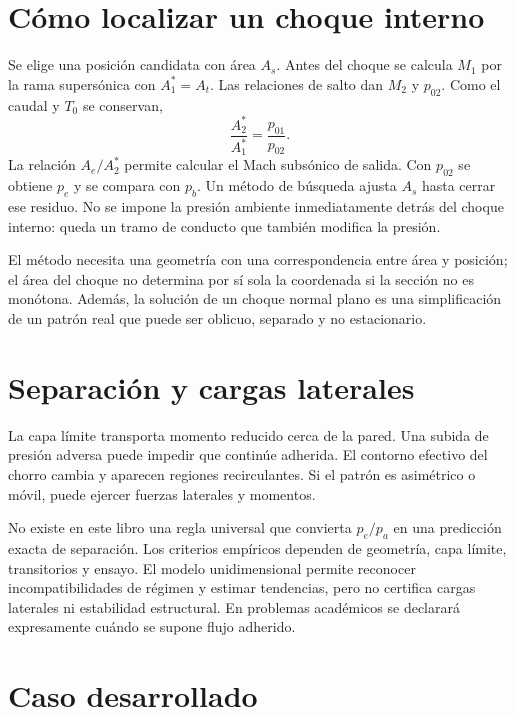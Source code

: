 \section{Cómo localizar un choque interno}
Se elige una posición candidata con área $A_s$. Antes del choque se calcula $M_1$ por la rama supersónica con $A^*_1=A_t$. Las relaciones de salto dan $M_2$ y $p_{02}$. Como el caudal y $T_0$ se conservan,
\[
 \frac{A^*_2}{A^*_1}=\frac{p_{01}}{p_{02}}.
\]
La relación $A_e/A^*_2$ permite calcular el Mach subsónico de salida. Con $p_{02}$ se obtiene $p_e$ y se compara con $p_b$. Un método de búsqueda ajusta $A_s$ hasta cerrar ese residuo. No se impone la presión ambiente inmediatamente detrás del choque interno: queda un tramo de conducto que también modifica la presión.

El método necesita una geometría con una correspondencia entre área y posición; el área del choque no determina por sí sola la coordenada si la sección no es monótona. Además, la solución de un choque normal plano es una simplificación de un patrón real que puede ser oblicuo, separado y no estacionario.
\section{Separación y cargas laterales}
La capa límite transporta momento reducido cerca de la pared. Una subida de presión adversa puede impedir que continúe adherida. El contorno efectivo del chorro cambia y aparecen regiones recirculantes. Si el patrón es asimétrico o móvil, puede ejercer fuerzas laterales y momentos.

No existe en este libro una regla universal que convierta $p_e/p_a$ en una predicción exacta de separación. Los criterios empíricos dependen de geometría, capa límite, transitorios y ensayo. El modelo unidimensional permite reconocer incompatibilidades de régimen y estimar tendencias, pero no certifica cargas laterales ni estabilidad estructural. En problemas académicos se declarará expresamente cuándo se supone flujo adherido.
\section{Caso desarrollado}

